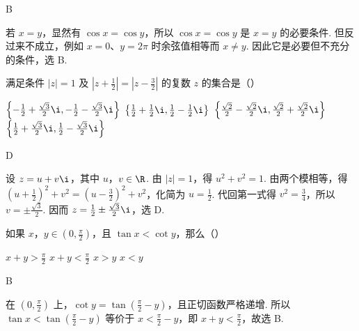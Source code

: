 \begin{answer}
B
\end{answer}

\begin{solution}
若 \(x=y\)，显然有 \(\cos x=\cos y\)，所以 \(\cos x=\cos y\) 是 \(x=y\) 的必要条件. 但反过来不成立，例如 \(x=0\)、\(y=2\pi\) 时余弦值相等而 \(x\neq y\). 因此它是必要但不充分的条件，选 B.
\end{solution}

\begin{problem}
满足条件 \(|z|=1\) 及 \(\left|z+\frac{1}{2}\right|=\left|z-\frac{3}{2}\right|\) 的复数 \(z\) 的集合是（\quad）

\choices
    {\(\left\{-\frac{1}{2}+\frac{\sqrt{3}}{2}\i,-\frac{1}{2}-\frac{\sqrt{3}}{2}\i\right\}\)}
    {\(\left\{\frac{1}{2}+\frac{1}{2}\i,\frac{1}{2}-\frac{1}{2}\i\right\}\)}
    {\(\left\{\frac{\sqrt{2}}{2}-\frac{\sqrt{2}}{2}\i,\frac{\sqrt{2}}{2}+\frac{\sqrt{2}}{2}\i\right\}\)}
    {\(\left\{\frac{1}{2}+\frac{\sqrt{3}}{2}\i,\frac{1}{2}-\frac{\sqrt{3}}{2}\i\right\}\)}
\end{problem}

\begin{answer}
D
\end{answer}

\begin{solution}
设 \(z=u+v\i\)，其中 \(u\)，\(v\in\R\). 由 \(|z|=1\)，得 \(u^2+v^2=1\). 由两个模相等，得 \((u+\frac12)^2+v^2=(u-\frac32)^2+v^2\)，化简为 \(u=\frac12\). 代回第一式得 \(v^2=\frac34\)，所以 \(v=\pm\frac{\sqrt3}{2}\). 因而 \(z=\frac12\pm\frac{\sqrt3}{2}\i\)，选 D.
\end{solution}

\begin{problem}
如果 \(x\)，\(y\in\left(0,\frac{\pi}{2}\right)\)，且 \(\tan x<\cot y\)，那么（\quad）

\choices
    {\(x+y>\frac{\pi}{2}\)}
    {\(x+y<\frac{\pi}{2}\)}
    {\(x>y\)}
    {\(x<y\)}
\end{problem}

\begin{answer}
B
\end{answer}

\begin{solution}
在 \(\left(0,\frac\pi2\right)\) 上，\(\cot y=\tan\left(\frac\pi2-y\right)\)，且正切函数严格递增. 所以 \(\tan x<\tan\left(\frac\pi2-y\right)\) 等价于 \(x<\frac\pi2-y\)，即 \(x+y<\frac\pi2\)，故选 B.
\end{solution}

